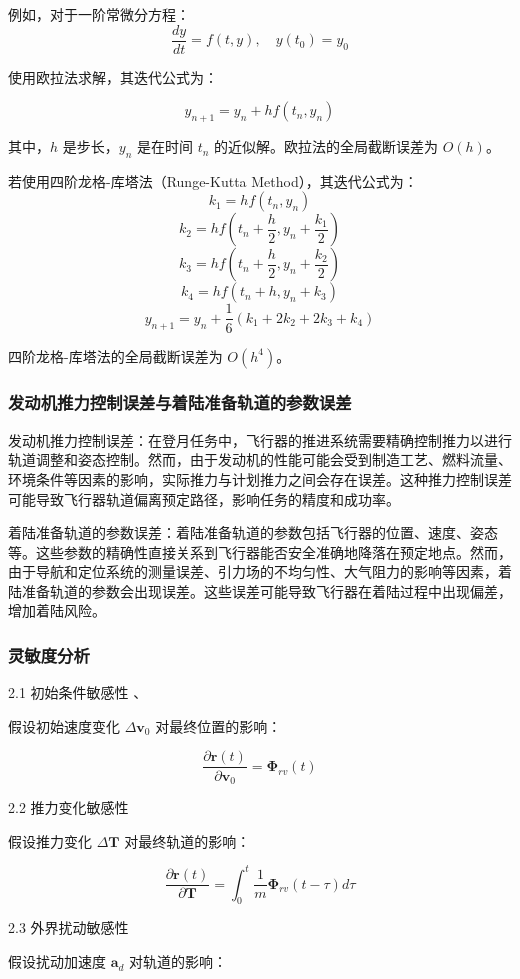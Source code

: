 \documentclass{ctexart}
\begin{document}
例如，对于一阶常微分方程：
\[
\frac{dy}{dt} = f(t, y), \quad y(t_0) = y_0
\]

使用欧拉法求解，其迭代公式为：

\[
y_{n+1} = y_n + h f(t_n, y_n)
\]

其中，\( h \) 是步长，\( y_n \) 是在时间 \( t_n \) 的近似解。欧拉法的全局截断误差为 \( O(h) \)。

若使用四阶龙格-库塔法（Runge-Kutta Method），其迭代公式为：
\[
k_1 = h f(t_n, y_n)
\]
\[
k_2 = h f(t_n + \frac{h}{2}, y_n + \frac{k_1}{2})
\]
\[
k_3 = h f(t_n + \frac{h}{2}, y_n + \frac{k_2}{2})
\]
\[
k_4 = h f(t_n + h, y_n + k_3)
\]
\[
y_{n+1} = y_n + \frac{1}{6} (k_1 + 2k_2 + 2k_3 + k_4)
\]

四阶龙格-库塔法的全局截断误差为 \( O(h^4) \)。
\subsubsection{发动机推力控制误差与着陆准备轨道的参数误差}

发动机推力控制误差：在登月任务中，飞行器的推进系统需要精确控制推力以进行轨道调整和姿态控制。然而，由于发动机的性能可能会受到制造工艺、燃料流量、环境条件等因素的影响，实际推力与计划推力之间会存在误差。这种推力控制误差可能导致飞行器轨道偏离预定路径，影响任务的精度和成功率。

着陆准备轨道的参数误差：着陆准备轨道的参数包括飞行器的位置、速度、姿态等。这些参数的精确性直接关系到飞行器能否安全准确地降落在预定地点。然而，由于导航和定位系统的测量误差、引力场的不均匀性、大气阻力的影响等因素，着陆准备轨道的参数会出现误差。这些误差可能导致飞行器在着陆过程中出现偏差，增加着陆风险。

\subsubsection{灵敏度分析}
2.1 初始条件敏感性
、


假设初始速度变化 $\Delta \mathbf{v}_0$ 对最终位置的影响：

\[
\frac{\partial \mathbf{r}(t)}{\partial \mathbf{v}_0} = \mathbf{\Phi}_{rv}(t)
\]

{2.2 推力变化敏感性}

假设推力变化 $\Delta \mathbf{T}$ 对最终轨道的影响：

\[
\frac{\partial \mathbf{r}(t)}{\partial \mathbf{T}} = \int_{0}^{t} \frac{1}{m} \mathbf{\Phi}_{rv}(t-\tau) d\tau
\]

{2.3 外界扰动敏感性}

假设扰动加速度 $\mathbf{a}_d$ 对轨道的影响：
\end{document}
